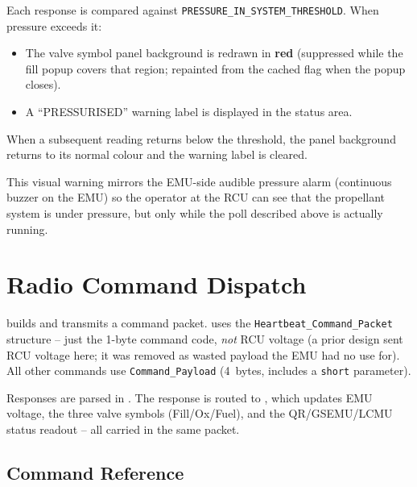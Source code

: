 ﻿\documentclass[11pt,letterpaper]{article}
\begin{document}
Each  response is compared against
\texttt{PRESSURE\_IN\_SYSTEM\_THRESHOLD}. When pressure exceeds it:
\begin{itemize}[nosep]
  \item The valve symbol panel background is redrawn in \textbf{red}
        (suppressed while the fill popup covers that region; repainted
        from the cached flag when the popup closes).
  \item A ``PRESSURISED'' warning label is displayed in the status area.
\end{itemize}

When a subsequent reading returns below the threshold, the panel
background returns to its normal colour and the warning label is cleared.

This visual warning mirrors the EMU-side audible pressure alarm (continuous
buzzer on the EMU) so the operator at the RCU can see that the propellant
system is under pressure, but only while the poll described above is
actually running.

\section{Radio Command Dispatch}

 builds and transmits a command
packet.   uses the \texttt{Heartbeat\_Command\_Packet}
structure -- just the 1-byte command code, \emph{not} RCU voltage (a prior
design sent RCU voltage here; it was removed as wasted payload the EMU had
no use for). All other commands use \texttt{Command\_Payload} (4~bytes,
includes a \texttt{short} parameter).

Responses are parsed in .
The  response is routed to ,
which updates EMU voltage, the three valve symbols (Fill/Ox/Fuel), and the
QR/GSEMU/LCMU status readout -- all carried in the same packet.

\subsection{Command Reference}
\end{document}
